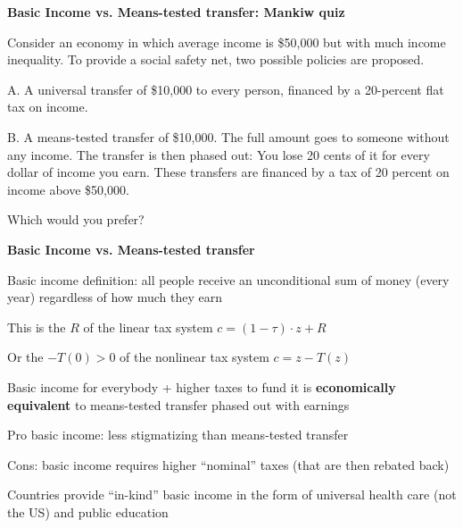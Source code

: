 \documentclass[landscape]{slides}
\begin{document}
\begin{slide}
\begin{center}
{\bf Basic Income vs. Means-tested transfer: Mankiw quiz}
\end{center}

Consider an economy in which average income is \$50,000 but with much income inequality. To provide a social safety net, two possible policies are proposed.

A.  A universal transfer of \$10,000 to every person, financed by a 20-percent flat tax on income.

B.  A means-tested transfer of \$10,000.  The full amount goes to someone without any income.  The transfer is then phased out: You lose 20 cents of it for every dollar of income you earn.  These transfers are financed by a tax of 20 percent on income above \$50,000.

Which would you prefer?

\end{slide}

\begin{slide}
\begin{center}
{\bf Basic Income vs. Means-tested transfer}
\end{center}
Basic income definition: all people receive an unconditional sum of money (every year) regardless of
how much they earn

This is the $R$ of the linear tax system $c= (1-\tau) \cdot z + R$ 

Or the $-T(0)>0$ of the nonlinear tax system $c=z-T(z)$


Basic income for everybody + higher taxes to fund it is \textbf{economically equivalent} to means-tested transfer phased out with earnings

Pro basic income: less stigmatizing than means-tested transfer

Cons: basic income requires higher ``nominal'' taxes (that are then rebated back)

Countries provide ``in-kind'' basic income in the form of universal health care (not the US)
and public education
\end{slide}

\begin{slide}

\end{slide}
\end{document}
